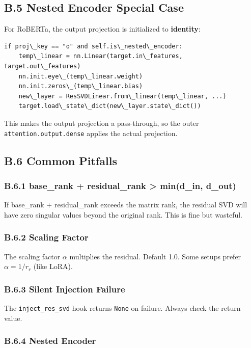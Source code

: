 \subsection{B.5 Nested Encoder Special Case}

For RoBERTa, the output projection is initialized to \textbf{identity}:

\begin{lstlisting}
if proj\_key == "o" and self.is\_nested\_encoder:
    temp\_linear = nn.Linear(target.in\_features, target.out\_features)
    nn.init.eye\_(temp\_linear.weight)
    nn.init.zeros\_(temp\_linear.bias)
    new\_layer = ResSVDLinear.from\_linear(temp\_linear, ...)
    target.load\_state\_dict(new\_layer.state\_dict())
\end{lstlisting}

This makes the output projection a pass-through, so the outer 
\texttt{attention.output.dense} applies the actual projection.

\subsection{B.6 Common Pitfalls}

\subsubsection{B.6.1 base\_rank + residual\_rank \textgreater{} min(d\_in, d\_out)}

If base\_rank + residual\_rank exceeds the matrix rank, the residual SVD 
will have zero singular values beyond the original rank. This is fine 
but wasteful.

\subsubsection{B.6.2 Scaling Factor}

The scaling factor $\alpha$ multiplies the residual. Default 1.0. Some 
setups prefer $\alpha = 1/r_r$ (like LoRA).

\subsubsection{B.6.3 Silent Injection Failure}

The \texttt{inject\_res\_svd} hook returns \texttt{None} on failure. Always check the 
return value.

\subsubsection{B.6.4 Nested Encoder}

